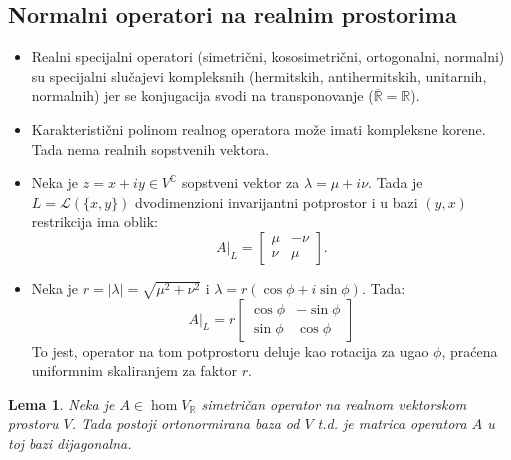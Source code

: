 \documentclass[a4paper,12pt,twoside]{report}
\newtheorem{lemma}{Lema}[section]
\numberwithin{algorithm}{section}
\begin{document}
\subsection{Normalni operatori na realnim prostorima}

\begin{itemize}
    \item Realni specijalni operatori (simetrični, kososimetrični, ortogonalni, normalni) su specijalni slučajevi kompleksnih (hermitskih, antihermitskih, unitarnih, normalnih) jer se konjugacija svodi na transponovanje ($\overline{\mathbb{R}} = \mathbb{R}$).
    \item Karakteristični polinom realnog operatora može imati kompleksne korene. Tada nema realnih sopstvenih vektora.
    \item Neka je $z = x + iy \in V^\mathbb{C}$ sopstveni vektor za $\lambda = \mu + i\nu$. Tada je $L = \mathcal{L}(\{x, y\})$ dvodimenzioni invarijantni potprostor i u bazi $(y, x)$ restrikcija ima oblik:
\[
    A|_L = \begin{bmatrix}
        \mu & -\nu \\
        \nu & \mu
    \end{bmatrix}.
\]
    \item Neka je $r = |\lambda| = \sqrt{\mu^2 + \nu^2}$ i $\lambda = r(\cos\phi + i\sin\phi)$. Tada:
\[
    A|_L = r \begin{bmatrix}
        \cos\phi & -\sin\phi \\
        \sin\phi & \cos\phi
    \end{bmatrix}
\]
To jest, operator na tom potprostoru deluje kao rotacija za ugao $\phi$, praćena uniformnim skaliranjem za faktor $r$.
\end{itemize}

\begin{lemma}
    Neka je $A \in \hom V_\mathbb{R}$ simetričan operator na realnom vektorskom prostoru $V$. Tada postoji ortonormirana baza 
    od $V$ t.d. je matrica operatora $A$ u toj bazi dijagonalna.
\end{lemma}
\end{document}
